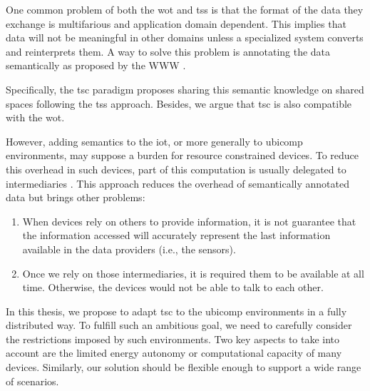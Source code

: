 \medskip

One common problem of both the \ac{wot} and \aclp{ts} is that the format of the data they exchange is multifarious and application domain dependent.
This implies that data will not be meaningful in other domains unless a specialized system converts and reinterprets them.
A way to solve this problem is annotating the data semantically as proposed by the WWW \cite{berners-lee_semantic_2001}.

Specifically, the \ac{tsc} paradigm \cite{fensel_triple-space_2004} proposes sharing this semantic knowledge on shared spaces following the \aclp{ts} approach.
Besides, we argue that \ac{tsc} is also compatible with the \ac{wot}.

However, adding semantics to the \ac{iot}, or more generally to \ac{ubicomp} environments, may suppose a burden for resource constrained devices.
To reduce this overhead in such devices, part of this computation is usually delegated to intermediaries \cite{honkola_smart-m3_2010}. %
This approach reduces the overhead of semantically annotated data but brings other problems:
\begin{enumerate}
 \item When devices rely on others to provide information, it is not guarantee that the information accessed will accurately represent the last information available in the data providers (i.e., the sensors).
 \item Once we rely on those intermediaries, it is required them to be available at all time. Otherwise, the devices would not be able to talk to each other.
\end{enumerate}

In this thesis, we propose to adapt \ac{tsc} to the \ac{ubicomp} environments in a fully distributed way.
To fulfill such an ambitious goal, we need to carefully consider the restrictions imposed by such environments.
Two key aspects to take into account are the limited energy autonomy or computational capacity of many devices.
Similarly, our solution should be flexible enough to support a wide range of scenarios.


